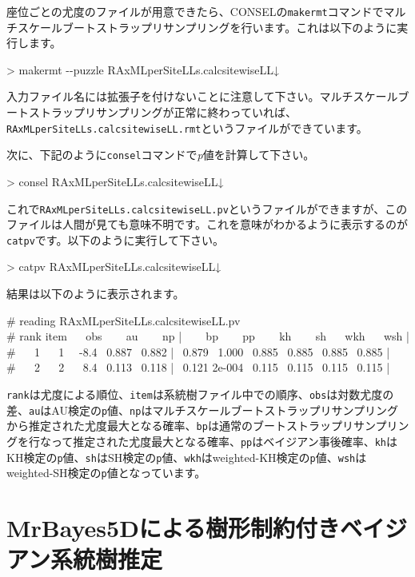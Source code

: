 \documentclass[titlepage,10pt,a4paper]{jsbook}
\newenvironment{cmd}{\begin{oframed}\raggedright\ttfamily\footnotesize\setlength{\baselineskip}{1.4em}}{\end{oframed}\vspace{-1em}}
\begin{document}
座位ごとの尤度のファイルが用意できたら、CONSELの\texttt{makermt}コマンドでマルチスケールブートストラップリサンプリングを行います。これは以下のように実行します。
\begin{cmd}
{\textgreater} makermt {-}{-}puzzle RAxML{\textunderscore}perSiteLLs.calcsitewiseLL↓
\end{cmd}
入力ファイル名には拡張子を付けないことに注意して下さい。マルチスケールブートストラップリサンプリングが正常に終わっていれば、\texttt{RAxML{\textunderscore}perSiteLLs.calcsitewiseLL.rmt}というファイルができています。

次に、下記のように\texttt{consel}コマンドで\textit{p}値を計算して下さい。
\begin{cmd}
{\textgreater} consel RAxML{\textunderscore}perSiteLLs.calcsitewiseLL↓
\end{cmd}
これで\texttt{RAxML{\textunderscore}perSiteLLs.calcsitewiseLL.pv}というファイルができますが、このファイルは人間が見ても意味不明です。これを意味がわかるように表示するのが\texttt{catpv}です。以下のように実行して下さい。
\begin{cmd}
{\textgreater} catpv RAxML{\textunderscore}perSiteLLs.calcsitewiseLL↓
\end{cmd}
結果は以下のように表示されます。
\begin{cmd}
\# reading RAxML{\textunderscore}perSiteLLs.calcsitewiseLL.pv\\
\# rank item~ ~ obs~ ~ ~au~ ~ ~np |~ ~ ~bp~ ~ ~pp~ ~ ~kh~ ~ ~sh~ ~ wkh~ ~ wsh |\\
\#~ ~ 1~ ~ 1~ ~-8.4~ 0.887~ 0.882 |~ 0.879~ 1.000~ 0.885~ 0.885~ 0.885~ 0.885 |\\
\#~ ~ 2~ ~ 2~ ~ 8.4~ 0.113~ 0.118 |~ 0.121 2e-004~ 0.115~ 0.115~ 0.115~ 0.115 |
\end{cmd}
\texttt{rank}は尤度による順位、\texttt{item}は系統樹ファイル中での順序、\texttt{obs}は対数尤度の差、\texttt{au}はAU検定の\texttt{p}値、\texttt{np}はマルチスケールブートストラップリサンプリングから推定された尤度最大となる確率、\texttt{bp}は通常のブートストラップリサンプリングを行なって推定された尤度最大となる確率、\texttt{pp}はベイジアン事後確率、\texttt{kh}はKH検定の\texttt{p}値、\texttt{sh}はSH検定の\texttt{p}値、\texttt{wkh}はweighted-KH検定の\texttt{p}値、\texttt{wsh}はweighted-SH検定の\texttt{p}値となっています。

\section{MrBayes5Dによる樹形制約付きベイジアン系統樹推定}
\end{document}
